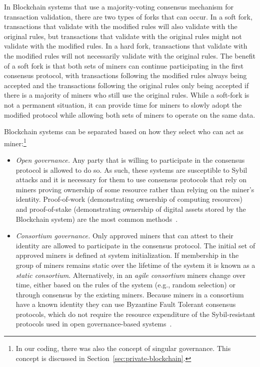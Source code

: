 In Blockchain systems that use a majority-voting consensus mechanism for transaction validation, there are two types of forks that can occur.
In a soft fork, transactions that validate with the modified rules will also validate with the original rules, but transactions that validate with the original rules might not validate with the modified rules.
In a hard fork, transactions that validate with the modified rules will not necessarily validate with the original rules.
The benefit of a soft fork is that both sets of miners can continue participating in the first consensus protocol, with transactions following the modified rules always being accepted and the transactions following the original rules only being accepted if there is a majority of miners who still use the original rules.
While a soft-fork is not a permanent situation, it can provide time for miners to slowly adopt the modified protocol while allowing both sets of miners to operate on the same data.

Blockchain systems can be separated based on how they select who can act as miner:\footnote{In our coding, there was also the concept of singular governance. This concept is discussed in Section~\ref{sec:private-blockchain}.}

\begin{itemize}
	\item \emph{Open governance.}
	Any party that is willing to participate in the consensus protocol is allowed to do so.
	As such, these systems are susceptible to Sybil attacks and it is necessary for them to use consensus protocols that rely on miners  proving ownership of some resource rather than relying on the miner's identity.
	Proof-of-work (demonstrating ownership of computing resources) and proof-of-stake (demonstrating ownership of digital assets stored by the Blockchain system) are the most common methods~\cite{Bano17,garay2018consensus}.
	
	\item \emph{Consortium governance.}
	Only approved miners that can attest to their identity are allowed to participate in the consensus protocol.
	The initial set of approved miners is defined at system initialization.
	If membership in the group of miners remains static over the lifetime of the system it is known as a \emph{static consortium}.
	Alternatively, in an \emph{agile consortium} miners change over time, either based on the rules of the system (e.g., random selection) or through consensus by the existing miners.
	Because miners in a consortium have a known identity they can use Byzantine Fault Tolerant consensus protocols, which do not require the resource expenditure of the Sybil-resistant protocols used in open governance-based systems~\cite{Bano17,garay2018consensus}.		
\end{itemize}

